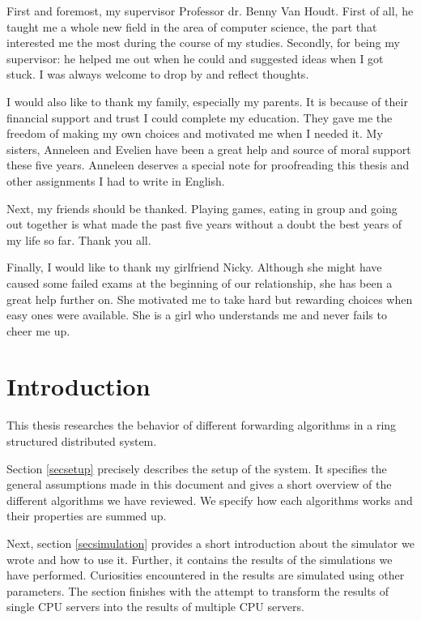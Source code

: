 \documentclass[10pt,a4paper]{article}
\begin{document}
First and foremost, my supervisor Professor dr. Benny Van Houdt. First of all, he taught me a whole new field in the area of computer science, the part that interested me the most during the course of my studies. Secondly, for being my supervisor: he helped me out when he could and suggested ideas when I got stuck. I was always welcome to drop by and reflect thoughts.

I would also like to thank my family, especially my parents. It is because of their financial support and trust I could complete my education. They gave me the freedom of making my own choices and motivated me when I needed it. My sisters, Anneleen and Evelien have been a great help and source of moral support these five years. Anneleen deserves a special note for proofreading this thesis and other assignments I had to write in English.

Next, my friends should be thanked. Playing games, eating in group and going out together is what made the past five years without a doubt the best years of my life so far. Thank you all.

Finally, I would like to thank my girlfriend Nicky. Although she might have caused some failed exams at the beginning of our relationship, she has been a great help further on. She motivated me to take hard but rewarding choices when easy ones were available. She is a girl who understands me and never fails to cheer me up.

\newpage

\tableofcontents

\newpage

\section*{Introduction}
This thesis researches the behavior of different forwarding algorithms in a ring structured distributed system.

Section \ref{secsetup} precisely describes the setup of the system. It specifies the general assumptions made in this document and gives a short overview of the different algorithms we have reviewed. We specify how each algorithms works and their properties are summed up.

Next, section \ref{secsimulation} provides a short introduction about the simulator we wrote and how to use it. Further, it contains the results of the simulations we have performed. Curiosities encountered in the results are simulated using other parameters. The section finishes with the attempt to transform the results of single CPU servers into the results of multiple CPU servers.
\end{document}
